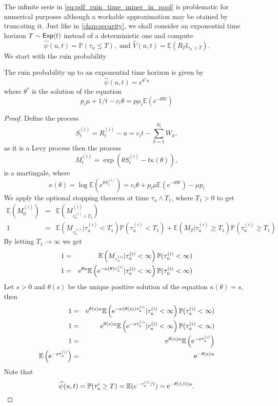 \noindent The infinite serie in \eqref{eq:pdf_ruin_time_miner_in_pool} is problematic for numerical purposes although a workable approximation may be otained by truncating it. Just like in \cref{chap:security}, we shall consider an exponential time horizon $T\sim\mathsf{Exp}(t)$ instead of a deterministic one and compute
\[
\widehat{\psi}(u,t) = \mathbb{P}(\tau_u \leq T),\text{ and }\widehat{V}(u,t) = \mathbb{E}(R_T\mathbb{I}_{\tau_u > T}).
\]
We start with the ruin probability
\begin{prop}\label{prop:rp_hat_miner_in_pool}
The ruin probability up to an exponential time horizon is given by 
\[
\widehat{\psi}(u,t) = e^{\theta^{\ast} u}
\]
where $\theta^{\ast}$ is the solution of the equation
\[
p_i\mu + 1/t - c_i \theta = p\mu_i\mathbb{E}\left(e^{-\theta W}\right)
\]
\end{prop}
\begin{proof}
Define the process
\[
S_t^{(i)} = R^{(i)}_t-u =c_i t-\sum_{k = 1}^{N_t}W_k,
\]
as it is a Levy process then the process
\[
M_t^{(i)}=\exp\left(\theta S_t^{(i)} - t\kappa(\theta)\right),
\]
is a martingale, where 
\[
\kappa(\theta) =\log \mathbb{E}(e^{\theta S_1^{(i)}}) = c_i\theta + p_i\mu \mathbb{E}\left(e^{-\theta W}\right) -\mu p_i
\]
We apply the optional stopping theorem at time $\tau_u\land T_1$, where $T_1>0$ to get 
\begin{eqnarray*}
\mathbb{E}\left(M_0^{(i)}\right) &=& \mathbb{E}\left(M_{\tau_u^{(i)}\land T_1}^{(i)}\right)\\
1 &=& \mathbb{E}\left(M_{\tau_u^{(i)}}|\tau_u^{(i)} < T_1\right)\mathbb{P}(\tau_u^{(i)} < T_1)+\mathbb{E}\left(M_T|\tau_u^{(i)} \geq T_1\right)\mathbb{P}(\tau_u^{(i)} \geq T_1)
\end{eqnarray*}
By letting $T_1\rightarrow \infty$ we get 
\begin{eqnarray*}
1 &=& \mathbb{E}\left(M_{\tau_u^{(i)}}|\tau_u^{(i)} < \infty\right)\mathbb{P}(\tau_u^{(i)} < \infty)\\
1 &=& \mathrm{e}^{\theta u}\mathbb{E}\left(\mathrm{e}^{-\kappa(\theta) \tau_u^{(i)}}|\tau_u^{(i)} < \infty\right)\mathbb{P}(\tau_u^{(i)} < \infty)
\end{eqnarray*}
Let $s>0$ and $\theta(s)$ be the unique positive solution of the equation $\kappa(\theta) =s$, then 
\begin{eqnarray*}
1 &=& \mathrm{e}^{\theta(s) u}\mathbb{E}\left(\mathrm{e}^{-\kappa(\theta(s)) \tau_u^{(i)}}|\tau_u^{(i)} < \infty\right)\mathbb{P}(\tau_u^{(i)} < \infty)\\
1 &=& \mathrm{e}^{\theta(s) u}\mathbb{E}\left(\mathrm{e}^{-s\tau_u^{(i)}}|\tau_u^{(i)} < \infty\right)\mathbb{P}(\tau_u^{(i)} < \infty)\\
1 &=& \mathrm{e}^{\theta(s) u}\mathbb{E}\left(\mathrm{e}^{-s\tau_u^{(i)}}\right)\\
\mathbb{E}\left(\mathrm{e}^{-s\tau_u^{(i)}}\right) &=& \mathrm{e}^{-\theta(s) u}\\
\end{eqnarray*}
Note that 
\[
\widehat{\psi}(u,t) = \mathbb{P}(\tau_u^{i}\geq T) = \mathbb{E}(e^{-\tau_u^{(i)}/t}) = \mathrm{e}^{-\theta(1/t) u}.
\]
\end{proof}
